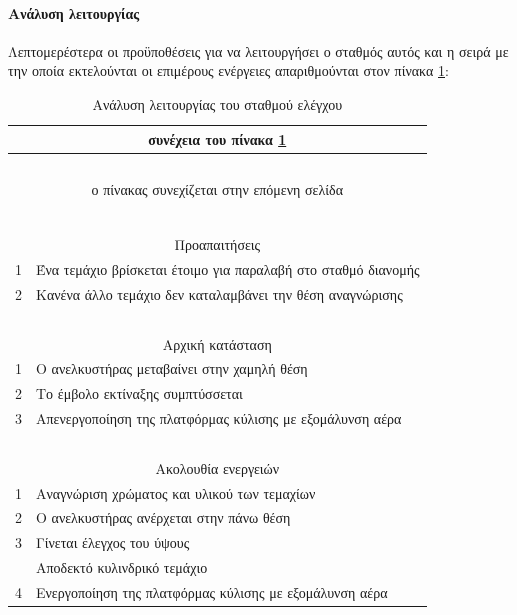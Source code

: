 \documentclass[a4paper,12pt,twoside]{report}
\begin{document}
				\paragraph{Ανάλυση λειτουργίας} {Λεπτομερέστερα οι προϋποθέσεις για να λειτουργήσει ο σταθμός αυτός και η σειρά με την οποία εκτελούνται οι επιμέρους ενέργειες απαριθμούνται στον πίνακα \ref{πιν.:Ανάλυση λειτουργίας του σταθμού ελέγχου}:
				}
				\begin{longtable} { m{0.5cm} m{12cm} }
					\caption [Ανάλυση λειτουργίας του σταθμού ελέγχου]  {Ανάλυση λειτουργίας του σταθμού ελέγχου \cite{FestoMPSTestingStationManual}}
					\label{πιν.:Ανάλυση λειτουργίας του σταθμού ελέγχου}\\
					\hline
					\endfirsthead
					\multicolumn{2}{c}{συνέχεια του πίνακα \ref{πιν.:Ανάλυση λειτουργίας του σταθμού ελέγχου}}\\
					\hline
					~\\
					\endhead
					\hline
					\multicolumn{2}{c}{ο πίνακας συνεχίζεται στην επόμενη σελίδα}\\
					\endfoot
					\multicolumn{2}{c}{ολοκληρώθηκε ο πίνακας \ref{πιν.:Ανάλυση λειτουργίας του σταθμού ελέγχου}}\\
					\endlastfoot
					~\\
					\multicolumn{2}{c}{Προαπαιτήσεις}\\
					1 & Ένα τεμάχιο βρίσκεται έτοιμο για παραλαβή στο σταθμό διανομής\\
					2 & Κανένα άλλο τεμάχιο δεν καταλαμβάνει την θέση αναγνώρισης\\
					\hline
					~\\
					\multicolumn{2}{c}{Αρχική κατάσταση}\\
					1 & Ο ανελκυστήρας μεταβαίνει στην χαμηλή θέση\\
					2 & Το έμβολο εκτίναξης συμπτύσσεται\\
					3 & Απενεργοποίηση της πλατφόρμας κύλισης με εξομάλυνση αέρα\\
					\hline
					~\\
					\multicolumn{2}{c}{Ακολουθία ενεργειών}\\
					1 & Αναγνώριση χρώματος και υλικού των τεμαχίων\\
					2 & Ο ανελκυστήρας ανέρχεται στην πάνω θέση\\
					3 & Γίνεται έλεγχος του ύψους\\
					   & Αποδεκτό κυλινδρικό τεμάχιο\\
					 4 & Ενεργοποίηση της πλατφόρμας κύλισης με εξομάλυνση αέρα\\

\end{longtable}
\end{document}

